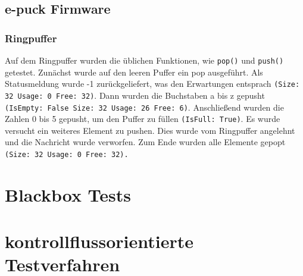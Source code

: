 \documentclass[10pt,a4paper]{article}
\begin{document}
		\subsection{e-puck Firmware}
		
			\subsubsection{Ringpuffer}
			Auf dem Ringpuffer wurden die üblichen Funktionen, wie \texttt{pop()} und \texttt{push()} getestet. Zunächst wurde auf den leeren Puffer ein pop ausgeführt. Als Statusmeldung wurde -1 zurückgeliefert, was den Erwartungen entsprach \texttt{(Size: 32  Usage: 0  Free: 32)}. Dann wurden die Buchstaben a bis z gepusht \texttt{(IsEmpty: False Size: 32  Usage: 26  Free: 6)}. Anschließend wurden die Zahlen 0 bis 5 gepusht, um den Puffer zu füllen \texttt{(IsFull: True)}. Es wurde versucht ein weiteres Element zu pushen. Dies wurde vom Ringpuffer angelehnt und die Nachricht wurde verworfen. Zum Ende wurden alle Elemente gepopt \texttt{(Size: 32  Usage: 0  Free: 32).}


	
	\section{Blackbox Tests}
	
	\section{kontrollflussorientierte Testverfahren}

				 			
\end{document}
